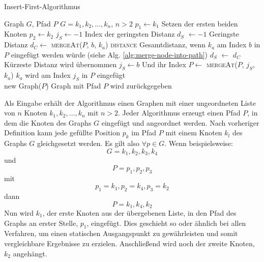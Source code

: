 \begin{algorithm}[H]
    \caption{Insert-First-Algorithmus}
    \label{alg:insert-first}
    \begin{algorithmic}[1]
        \Require Graph $G$, Pfad $P$
        \Require $G = k_1,k_2,\ldots,k_n$, $n > 2$
        \State $p_1 \gets k_1$
        \Comment Setzen der ersten beiden Knoten
        \State $p_2 \gets k_2$
            \State $j_S \gets -1$
            \Comment Index der geringsten Distanz
            \State $d_S$ $\gets -1$
            \Comment Geringste Distanz
                \State $d_C \gets$ \textsc{mergeAt}($P$, $b$, $k_a$) \textsc{distance}
                \Comment Gesamtdistanz, wenn $k_a$ am Index $b$ in $P$ eingefügt werden würde (siehe Alg. \vref{alg:merge-node-into-path})
                    \State $d_S$ $\gets$ $d_C$
                    \Comment Kürzeste Distanz wird übernommen
                    \State $j_S \gets b$
                    \Comment Und ihr Index
                \EndIf
            \EndFor
            \State $P \gets$ \textsc{mergeAt}($P$, $j_S$, $k_a$)
            \Comment $k_a$ wird am Index $j_S$ in $P$ eingefügt
        \EndFor \\
        \Return new Graph($P$)
        \Comment Graph mit Pfad $P$ wird zurückgegeben
    \end{algorithmic}
\end{algorithm}
Als Eingabe erhält der Algorithmus einen Graphen mit einer ungeordneten Liste von $n$ Knoten $k_1,k_2,\ldots,k_n$ mit $n > 2$.
Jeder Algorithmus erzeugt einen Pfad $P$, in dem die Knoten des Graphs $G$ eingefügt und angeordnet werden.
Nach vorheriger Definition kann jede gefüllte Position $p_k$ im Pfad $P$ mit einem Knoten $k_l$ des Graphs $G$ gleichgesetzt werden.
Es gilt also $\forall p \in G$.
Wenn beispielsweise:
$$G = k_1,k_2,k_3,k_4$$
und
$$P=p_1,p_2,p_3$$
mit
$$p_1=k_1,p_2=k_4,p_3=k_2$$
dann
$$P=k_1,k_4,k_2$$
Nun wird $k_1$, der erste Knoten aus der übergebenen Liste, in den Pfad des Graphs an erster Stelle, $p_1$, eingefügt. 
Dies geschieht so oder ähnlich bei allen Verfahren, um einen statischen Ausgangspunkt zu gewährleisten und somit vergleichbare Ergebnisse zu erzielen.
Anschließend wird noch der zweite Knoten, $k_2$ angehängt.

